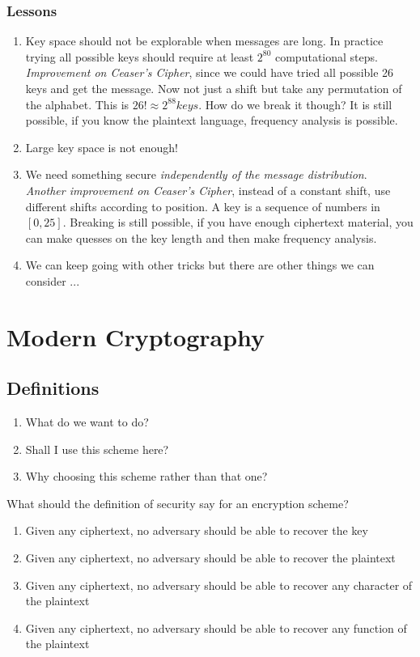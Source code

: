 \documentclass[11pt, oneside]{article}   	%
\begin{document}
\subsubsection{Lessons}
\begin{enumerate}
\item Key space should not be explorable when messages are long. In practice trying all possible keys should require at least $2^{80}$ computational steps. \\
\emph{Improvement on Ceaser's Cipher}, since we could have tried all possible 26 keys and get the message. Now not just a shift but take any permutation of the alphabet. This is $26! \approx 2^{88} keys$.
How do we break it though? It is still possible, if you know the plaintext language, frequency analysis is possible.
\item Large key space is not enough!
\item We need something secure \emph{independently of the message distribution}.\\
\emph{Another improvement on Ceaser's Cipher}, instead of a constant shift, use different shifts according to position. A key is a sequence of numbers in $[0,25]$. Breaking is still possible, if you have enough ciphertext material, you can make quesses on the key length and then make frequency analysis.
\item We can keep going with other tricks but there are other things we can consider ...
\end{enumerate}

\section{Modern Cryptography}
\subsection{Definitions}
\begin{enumerate}
\item What do we want to do?
\item Shall I use this scheme here?
\item Why choosing this scheme rather than that one?
\end{enumerate}
\newpage
What should the definition of security say for an encryption scheme?
\begin{enumerate}
\item Given any ciphertext, no adversary should be able to recover the key
\item Given any ciphertext, no adversary should be able to recover the plaintext
\item Given any ciphertext, no adversary should be able to recover any character of the plaintext
\item Given any ciphertext, no adversary should be able to recover any function of the plaintext
\end{enumerate}
\end{document}
